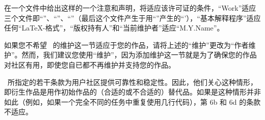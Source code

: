 \begin{LPPLicense}
    在一个文件中给出这样的一个注意和声明，将适应该许可证的条件，``Work''适应三个文件即``''、``''、``''（最后这个文件产生于用``''产生的``'），``基本解释程序''适应任何``\LaTeX-格式''，``版权持有人''和``当前维护者''适应``M.Y.Name''。


    如果您不希望 \LPPL\ 的维护这一节适应于您的作品，请将上述的``维护''更改为``作者维护''。然而，我们建议您使用``维护''，因为添加维护这一节就是为了确保您的作品对社区有用，即使您自已都不再维护并支持您的作品。


    \label{LPPL:NotReplacements}


    \LPPL\ 所指定的若干条款为用户社区提供可靠性和稳定性。因此，他们关心这种情形，即衍生作品是用作初始作品的（合适的或不合适的）替代品。如果是这种情形并非如此（例如，如果一个完全不同的任务中重复使用几行代码），第 6b 和 6d 的条款不适应。

    \label{LPPL:Recommendations}




\end{LPPLicense}
